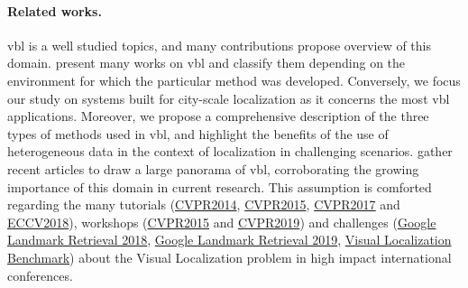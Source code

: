 	\paragraph{Related works.} 
    	\ac{vbl} is a well studied topics, and many contributions propose overview of this domain. \citet{Brejcha2017} present many works on \ac{vbl} and classify them depending on the environment for which the particular method was developed. Conversely, we focus our study on systems built for city-scale localization as it concerns the most \ac{vbl} applications. Moreover, we propose a comprehensive description of the three types of methods used in \ac{vbl}, and highlight the benefits of the use of heterogeneous data in the context of localization in challenging scenarios. \citet{Zamir2016} gather recent articles to draw a large panorama of \ac{vbl}, corroborating the growing importance of this domain in current research. This assumption is comforted regarding the many tutorials (\href{https://sites.google.com/site/lsvpr2014/}{CVPR2014}, \href{https://roboticvision.atlassian.net/wiki/display/PUB/CVPR+2015+Workshop+on+Visual+Place+Recognition+in+Changing+Environments}{CVPR2015}, \href{https://sites.google.com/view/lsvpr2017/home}{CVPR2017} and \href{https://sites.google.com/view/visual-localization-eccv-2018/home}{ECCV2018}), workshops (\href{https://roboticvision.atlassian.net/wiki/display/PUB/CVPR+2015+Workshop+on+Visual+Place+Recognition+in+Changing+Environments}{CVPR2015} and \href{https://sites.google.com/view/ltvl2019}{CVPR2019}) and challenges (\href{https://www.kaggle.com/c/landmark-retrieval-challenge}{Google Landmark Retrieval 2018}, \href{https://www.kaggle.com/c/landmark-retrieval-2019}{Google Landmark Retrieval 2019}, \href{https://www.visuallocalization.net/}{Visual Localization Benchmark}) about the Visual Localization problem in high impact international conferences.
    	
